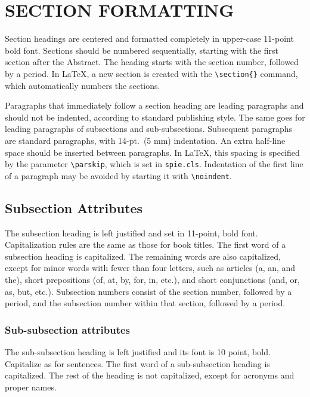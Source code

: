 \documentclass[]{spie}  %
\begin{document}
\section{SECTION FORMATTING} \label{sect:sections}

Section headings are centered and formatted completely in upper-case 11-point bold font.  Sections should be numbered sequentially, starting with the first section after the Abstract.  The heading starts with the section number, followed by a period.  In LaTeX, a new section is created with the \verb|\section{}| command, which automatically numbers the sections.

Paragraphs that immediately follow a section heading are leading paragraphs and should not be indented, according to standard publishing style\cite{Lamport94}.  The same goes for leading paragraphs of subsections and sub-subsections.  Subsequent paragraphs are standard paragraphs, with 14-pt.\ (5 mm) indentation.  An extra half-line space should be inserted between paragraphs.  In LaTeX, this spacing is specified by the parameter \verb|\parskip|, which is set in {\tt spie.cls}.  Indentation of the first line of a paragraph may be avoided by starting it with \verb|\noindent|.
 
\subsection{Subsection Attributes} 

The subsection heading is left justified and set in 11-point, bold font.  Capitalization rules are the same as those for book titles.  The first word of a subsection heading is capitalized.  The remaining words are also capitalized, except for minor words with fewer than four letters, such as articles (a, an, and the), short prepositions (of, at, by, for, in, etc.), and short conjunctions (and, or, as, but, etc.).  Subsection numbers consist of the section number, followed by a period, and the subsection number within that section, followed by a period.  

\subsubsection{Sub-subsection attributes} 
The sub-subsection heading is left justified and its font is 10 point, bold.  Capitalize as for sentences.  The first word of a sub-subsection heading is capitalized.  The rest of the heading is not capitalized, except for acronyms and proper names.  
\end{document}
